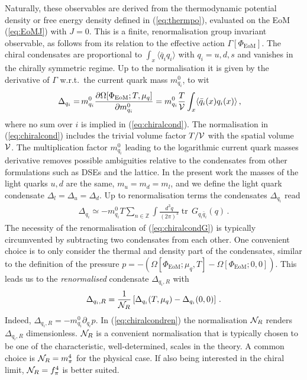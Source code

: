 \documentclass[%
reprint,
superscriptaddress,
showpacs,preprintnumbers,
 amsmath,amssymb,
 aps,
prd,
]{revtex4-1}
\newcommand{\tr}{\ensuremath{\operatorname{tr}}}
\def\eq#1{(\ref{#1})}
\begin{document}
Naturally, these observables are derived from the thermodynamic
potential density or free energy density defined in \eq{eq:thermpo},
evaluated on the EoM \eq{eq:EoMJ} with $J=0$. This is a finite,
renormalisation group invariant observable, as follows from its
relation to the effective action $\Gamma[\Phi_{\textrm{EoM}}]$. The
chiral condensates are proportional to
$\int_x \langle \bar q_i q_i\rangle$ with $q_i=u,d,s$ and vanishes in
the chirally symmetric regime. Up to the normalisation it is given by
the derivative of $\Gamma$ w.r.t.\ the current quark mass $m^0_{q_i}$,
to wit
%
\begin{align}
  \Delta_{q_i} =
  &\,  m_{q_i}^0\frac{\partial
    \Omega[\Phi_{\textrm{EoM}};T,\mu_q]}{\partial {m^0_{q_i}}}=
    m_{q_i}^0  \frac{T}{\cal V} \int_x \langle \bar q_i(x) q_i(x)\rangle\,,
                 \label{eq:chiralcond}
\end{align} 
%
where no sum over $i$ is implied in \eq{eq:chiralcond}. The
normalisation in \eq{eq:chiralcond} includes the trivial volume factor
$T/{\cal V}$ with the spatial volume $\cal V$. The multiplication
factor $m_{q_i}^0$ leading to the logarithmic current quark masses
derivative removes possible ambiguities relative to the condensates
from other formulations such as DSEs and the lattice. In the present
work the masses of the light quarks $u,d$ are the same, $m_u=m_d=m_l$,
and we define the light quark condensate
$\Delta_{l}= \Delta_{u}= \Delta_{d}$. Up to renormalisation terms the
condensates $\Delta_{q_i}$ read
%
\begin{align}\label{eq:chiralcondG}
  \Delta_{q_i}\simeq  - m_{q_i}^0
  T\sum_{n\in\mathbb{Z}} \int \frac{d^3 q}{(2 \pi)^3}
  \tr \,G_{q_i\bar q_i} (q)\,. 
\end{align}
The necessity of the renormalisation of \eq{eq:chiralcondG} is
typically circumvented by subtracting two condensates from each other.
One convenient choice is to only consider the thermal and density part
of the condensates, similar to the definition of the pressure
$p=
-(\Omega[\Phi_\textrm{EoM};\mu_q,T]-\Omega[\Phi_\textrm{EoM};0,0])$. This
leads us to the \textit{renormalised} condensate $\Delta_{q_i,R}$ with
%
\begin{align}\label{eq:chiralcondren}
  \Delta_{q_i,R} = \frac{1}{{\cal N}_R}\left[\Delta_{q_i}(T,\mu_q) - 
  \Delta_{q_i}(0,0)\right]\,.
\end{align}
%
Indeed, $\Delta_{q_i,R} = - m^0_{q_i} \partial_{q_i} p$. In
\eq{eq:chiralcondren} the normalisation ${\cal N}_R$ renders
$\Delta_{q_i,R}$ dimensionless.  ${\cal N}_R$ is a convenient
normalisation that is typically chosen to be one of the
characteristic, well-determined, scales in the theory. A common choice
is ${\cal N}_R= m_\pi^4$ for the physical case. If also being
interested in the chiral limit, ${\cal N}_R= f_\pi^4$ is better
suited.
\end{document}
